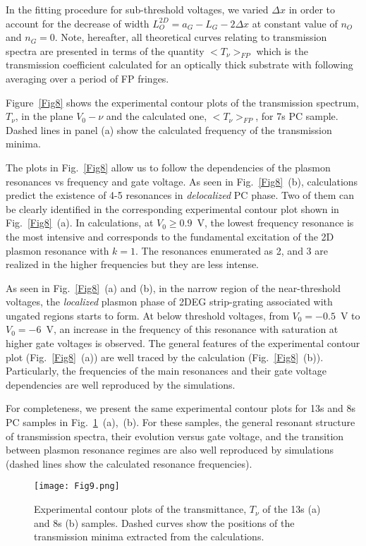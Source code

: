 \documentclass[%
 reprint,
 amsmath,amssymb,
 aps,
]{revtex4-2}
\begin{document}
In the fitting procedure for sub-threshold voltages, we varied $\Delta x$ 
in order to account for  the  decrease of width $L^{2D}_{O} = a_G - L_G-2\Delta x$ at constant value of $n_O$ and $n_G = 0$.
Note,  hereafter, all theoretical curves relating to transmission spectra are presented in terms of the quantity $<T_{\nu}>_{FP}$ which is the transmission coefficient calculated for an optically thick substrate with following averaging over a period of FP fringes. 

Figure~\ref{Fig8} shows the experimental contour plots of the transmission spectrum, $T_{\nu}$, in the plane {$V_0 - \nu$} and the calculated one, $<T_{\nu}>_{FP}$, for 7s PC sample. Dashed lines in panel (a) show the calculated frequency of the transmission minima.

The plots in Fig.~\ref{Fig8} allow us to follow the dependencies of the plasmon resonances vs frequency and gate voltage. As seen in Fig.~\ref{Fig8}~(b), calculations predict the existence of 4-5 resonances in \textit{delocalized} PC phase. 
Two of them can be clearly identified in the corresponding experimental contour plot shown in Fig.~\ref{Fig8}~(a). 
In calculations, at $V_0 \geq 0.9$~V, the lowest frequency resonance is the most intensive and corresponds to the fundamental excitation of the 2D plasmon resonance with $k = 1$. 
The resonances enumerated as 2, and 3 are realized in the higher frequencies but they are less intense. 

As seen in Fig.~\ref{Fig8}~(a) and (b), in the narrow region of the near-threshold voltages, the \textit{ localized} plasmon phase of 2DEG strip-grating associated with ungated regions starts to form. At below threshold voltages, from $V_0 = -0.5$~V to $V_0 = - 6$~V, an increase in the frequency of this resonance with saturation at higher gate voltages is observed. 
The general features of the experimental  contour plot (Fig.~\ref{Fig8}~(a)) are well traced by the calculation (Fig.~\ref{Fig8}~(b)).
Particularly, the frequencies of the main resonances and their gate voltage dependencies are well reproduced by the simulations.

For completeness, we present the same experimental contour plots for 13s and 8s PC samples in Fig.~\ref{Fig9}~(a),~(b).
For these samples, the general resonant structure of transmission spectra, their evolution versus gate voltage, and the transition between plasmon resonance regimes are also well reproduced by simulations (dashed lines show the calculated resonance frequencies).

\begin{figure}[t]
\texttt{[image: Fig9.png]}
\caption{Experimental contour plots of the transmittance, $T_{\nu}$ of the 13s (a) and 8s (b) samples. Dashed curves show the positions of the transmission minima extracted from the calculations.}
\label{Fig9}
\end{figure}
\end{document}
